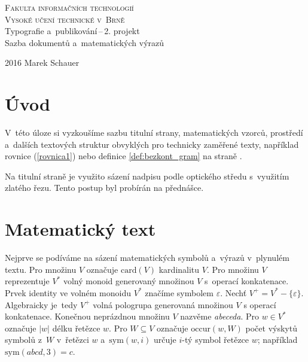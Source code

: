 \documentclass[a4paper, twocolumn, 11pt]{article}
\theoremstyle{definition}
\theoremstyle{plain}
\theoremstyle{plain}
\begin{document}
	\begin{titlepage}
		\begin{center}
		{\Huge
		\textsc{Fakulta informačních technologií\\Vysoké učení technické v~Brně}}\\
		{\LARGE
		Typografie a~publikování\,--\,2. projekt\\
						Sazba dokumentů a~matematických výrazů}
		\end{center}
		{\Large 2016 \hfill
		Marek Schauer}
	\end{titlepage}

	\section*{Úvod}
	V~této úloze si vyzkoušíme sazbu titulní strany, matematických vzorců, prostředí a~dalších textových struktur obvyklých pro technicky zaměřené texty, například rovnice (\ref{rovnica1}) nebo definice \ref{def:bezkont_gram} na straně \pageref{def:bezkont_gram}.

	Na titulní straně je využito sázení nadpisu podle optického středu s~využitím zlatého řezu. Tento postup byl probírán na přednášce.
	\section{Matematický text}
	Nejprve se podíváme na sázení matematických symbolů a~výrazů v~plynulém textu. Pro množinu $V$ označuje $\mbox{card}(V)$ kardinalitu $V$.
	Pro množinu $V$ reprezentuje $V^*$ volný monoid generovaný množinou $V$ s~operací konkatenace.
	Prvek identity ve volném monoidu $V^*$ značíme symbolem $\varepsilon$.
	Nechť $V^+=V^*-\{\varepsilon\}$. Algebraicky je~tedy $V^+$ volná pologrupa generovaná množinou $V$ s                                                                                                         operací konkatenace.
	Konečnou neprázdnou množinu $V$ nazvěme \emph{abeceda}.
	Pro $w \in V^*$ označuje $|w|$ délku řetězce $w$. Pro $W \subseteq V$ označuje $\mbox{occur}(w,W)$ počet výskytů symbolů z~$W$ v~řetězci $w$ a~$\mbox{sym}(w,i)$ určuje $i$-tý symbol řetězce $w$; například $\mbox{sym}(abcd,3)=c$.
\end{document}
